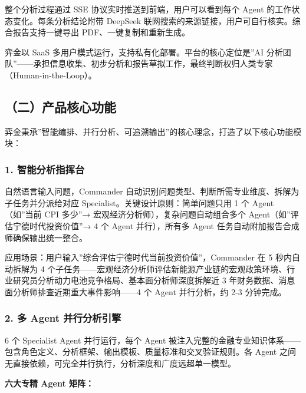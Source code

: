 \documentclass[
]{ctexart}
\begin{document}
整个分析过程通过 SSE 协议实时推送到前端，用户可以看到每个 Agent
的工作状态变化。每条分析结论附带 DeepSeek
联网搜索的来源链接，用户可自行核实。综合报告支持一键导出
PDF、一键复制和重新生成。

弈金以 SaaS 多用户模式运行，支持私有化部署。平台的核心定位是''AI
分析团队''------承担信息收集、初步分析和报告草拟工作，最终判断权归人类专家（Human-in-the-Loop）。

\subsection{（二）产品核心功能}\label{ux4e8cux4ea7ux54c1ux6838ux5fc3ux529fux80fd}

弈金秉承''智能编排、并行分析、可追溯输出''的核心理念，打造了以下核心功能模块：

\subsubsection{1.
智能分析指挥台}\label{ux667aux80fdux5206ux6790ux6307ux6325ux53f0}

自然语言输入问题，Commander
自动识别问题类型、判断所需专业维度、拆解为子任务并分派给对应
Specialist。关键设计原则：简单问题只用 1 个 Agent（如''当前 CPI 多少''→
宏观经济分析师），复杂问题自动组合多个
Agent（如''评估宁德时代投资价值''→ 4 个 Agent 并行），所有多 Agent
任务自动附加报告合成师确保输出统一整合。

应用场景：用户输入''综合评估宁德时代当前投资价值''，Commander 在 5
秒内自动拆解为 4
个子任务------宏观经济分析师评估新能源产业链的宏观政策环境、行业研究员分析动力电池竞争格局、基本面分析师深度拆解近
3 年财务数据、消息面分析师排查近期重大事件影响------4 个 Agent
并行分析，约 2-3 分钟完成。

\subsubsection{2. 多 Agent
并行分析引擎}\label{ux591a-agent-ux5e76ux884cux5206ux6790ux5f15ux64ce}

6 个 Specialist Agent 并行运行，每个 Agent
被注入完整的金融专业知识体系------包含角色定义、分析框架、输出模板、质量标准和交叉验证规则。各
Agent 之间无直接依赖，可完全并行执行，分析深度和广度远超单一模型。

\textbf{六大专精 Agent 矩阵：}
\end{document}
